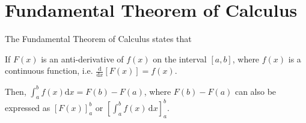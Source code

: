 \documentclass[11pt,a4paper]{book}
\begin{document}
\newpage

\section{Fundamental Theorem of Calculus}

The Fundamental Theorem of Calculus states that

\begin{tcolorbox}[colback=blue!5, colframe=black, boxrule=.4pt, sharpish corners]

If $F\left(x\right)$ is an anti-derivative of $f\left(x\right)$
on the interval $\left[a,b\right]$, where $f\left(x\right)$ is a
continuous function, i.e. ${\displaystyle \frac{\mathrm{d}}{\mathrm{d}x}[F(x)]=f(x)}$.

Then, ${\displaystyle \int_{a}^{b}f(x)\mathrm{d}x=F(b)-F(a)}$, where $F\left(b\right)-F\left(a\right)$
can also be expressed as ${\displaystyle \left[F(x)\right]_{a}^{b}}$
or ${\displaystyle \left[\int_{a}^{b}f(x)\,\mathrm{d}x\right]_{a}^{b}}$.

\end{tcolorbox}
\end{document}
